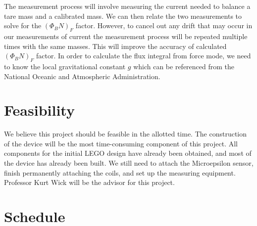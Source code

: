 \documentclass[aps,prstab,reprint,12pt]{revtex4-1}
\begin{document}
The measurement process will involve measuring the current needed to balance a tare mass and a calibrated mass. We can then relate the two measurements to solve for the $(\Phi_B N)_F$ factor. However, to cancel out any drift that may occur in our measurements of current the measurement process will be repeated multiple times with the same masses. This will improve the accuracy of calculated $(\Phi_B N)_F$ factor. In order to calculate the flux integral from force mode, we need to know the local gravitational constant $g$ which can be referenced from the National Oceanic and Atmospheric Administration.







\section{Feasibility}
We believe this project should be feasible in the allotted time. The construction of the device will be the most time-consuming component of this project. All components for the initial LEGO design have already been obtained, and most of the device has already been built. We still need to attach the Microepsilon sensor, finish permanently attaching the coils, and set up the measuring equipment. 
Professor Kurt Wick will be the advisor for this project.

\newpage
\section{Schedule}
\end{document}
